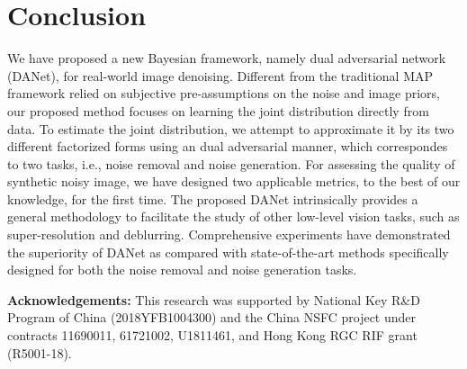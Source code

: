 \documentclass[runningheads]{llncs}
\begin{document}
\vspace{-2mm}\section{Conclusion}\vspace{-2mm}
We have proposed a new Bayesian framework, namely dual adversarial network (DANet),
for real-world image denoising. Different from the traditional MAP framework relied on subjective
pre-assumptions on the noise and image priors, our proposed method
focuses on learning the joint distribution directly from data. To estimate the joint distribution,
we attempt to approximate it by its two different factorized forms using an dual adversarial manner,
which correspondes to two tasks, i.e., noise removal and noise generation.
For assessing the quality of synthetic noisy image, we have designed two applicable metrics, to
the best of our knowledge, for the first time.
The proposed DANet intrinsically provides a general methodology to facilitate the study of other low-level
vision tasks, such as super-resolution and deblurring.
Comprehensive experiments have demonstrated the superiority
of DANet as compared with state-of-the-art methods specifically designed for both the noise removal and
noise generation tasks.

\vspace{2mm}\noindent\textbf{Acknowledgements:} This research was supported by National Key R\&D Program of
China (2018YFB1004300) and the China NSFC project under contracts 11690011, 61721002, U1811461, and Hong Kong
RGC RIF grant (R5001-18).





\clearpage


\end{document}
